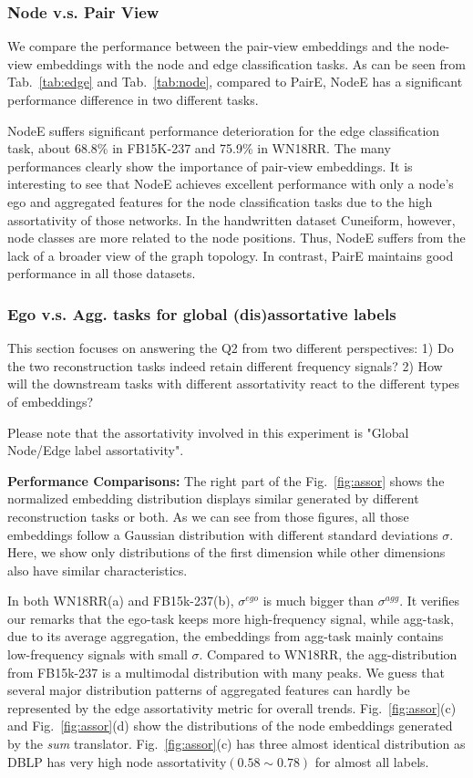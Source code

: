 \documentclass[10pt,journal,compsoc]{IEEEtran}
\begin{document}
\subsubsection{Node v.s. Pair View}
We compare the performance between the pair-view embeddings and the node-view embeddings with the node and edge classification tasks. As can be seen from Tab.~\ref{tab:edge} and Tab.~\ref{tab:node}, compared to  PairE, NodeE has a significant performance difference in two different tasks. 

NodeE suffers significant performance deterioration for the edge classification task, about 68.8\% in FB15K-237 and 75.9\% in WN18RR. The many performances clearly show the importance of pair-view embeddings. It is interesting to see that NodeE achieves excellent performance with only a node's ego and aggregated features for the node classification tasks due to the high assortativity of those networks. In the handwritten dataset Cuneiform, however, node classes are more related to the node positions. Thus, NodeE suffers from the lack of a broader view of the graph topology. In contrast, PairE maintains good performance in all those datasets.

\subsubsection {Ego v.s. Agg. tasks for global (dis)assortative labels}

This section focuses on answering the Q2 from two different perspectives: 1) Do the two reconstruction tasks indeed retain different frequency signals?  2) How will the downstream tasks with different assortativity react to the different types of embeddings?


Please note that the assortativity involved in this experiment is "Global Node/Edge label assortativity".

\noindent\textbf{Performance Comparisons:} The right part of the Fig.~\ref{fig:assor} shows the normalized embedding distribution displays similar generated by different reconstruction tasks or both. As we can see from those figures, all those embeddings follow a Gaussian distribution with different standard deviations $\sigma$. Here, we show only distributions of the first dimension while other dimensions also have similar characteristics. 

In both WN18RR(a) and FB15k-237(b), $\sigma^{ego}$ is much bigger than $\sigma^{agg}$. It verifies our remarks that the ego-task keeps more high-frequency signal, while agg-task, due to its average aggregation, the embeddings from agg-task mainly contains low-frequency signals with small $\sigma$. Compared to WN18RR, the agg-distribution from FB15k-237 is a multimodal distribution with many peaks. We guess that several major distribution patterns of aggregated features can hardly be represented by the edge assortativity metric for overall trends. Fig.~\ref{fig:assor}(c) and Fig.~\ref{fig:assor}(d) show the distributions of the node embeddings generated by the \textit{sum} translator. Fig.~\ref{fig:assor}(c) has three almost identical distribution as DBLP has very high node assortativity$(0.58\sim0.78)$ for almost all labels. 
\end{document}
